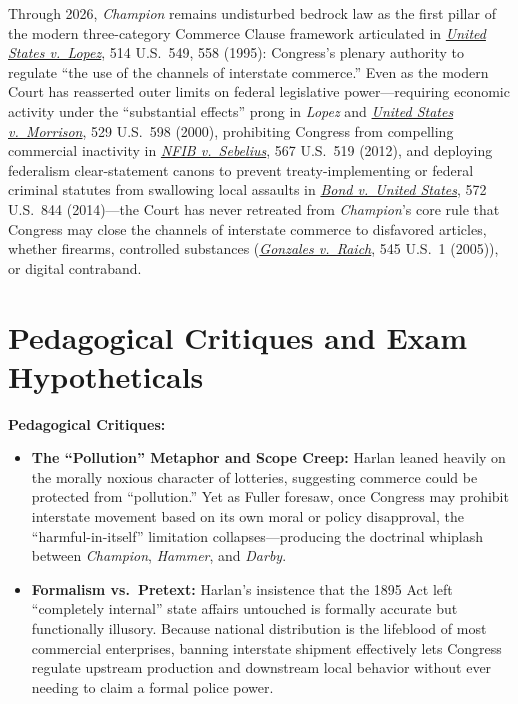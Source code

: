 \documentclass[12pt]{article}
\begin{document}
Through 2026, \textit{Champion} remains undisturbed bedrock law as the first pillar of the modern three-category Commerce Clause framework articulated in \href{https://supreme.justia.com/cases/federal/us/514/549/}{\textit{United States v.\ Lopez}}, 514 U.S.\ 549, 558 (1995): Congress's plenary authority to regulate ``the use of the channels of interstate commerce.'' Even as the modern Court has reasserted outer limits on federal legislative power---requiring economic activity under the ``substantial effects'' prong in \textit{Lopez} and \href{https://supreme.justia.com/cases/federal/us/529/598/case.pdf}{\textit{United States v.\ Morrison}}, 529 U.S.\ 598 (2000), prohibiting Congress from compelling commercial inactivity in \href{https://supreme.justia.com/cases/federal/us/567/519/}{\textit{NFIB v.\ Sebelius}}, 567 U.S.\ 519 (2012), and deploying federalism clear-statement canons to prevent treaty-implementing or federal criminal statutes from swallowing local assaults in \href{https://supreme.justia.com/cases/federal/us/572/844/}{\textit{Bond v.\ United States}}, 572 U.S.\ 844 (2014)---the Court has never retreated from \textit{Champion}'s core rule that Congress may close the channels of interstate commerce to disfavored articles, whether firearms, controlled substances (\href{https://supreme.justia.com/cases/federal/us/545/1/}{\textit{Gonzales v.\ Raich}}, 545 U.S.\ 1 (2005)), or digital contraband.

\section{Pedagogical Critiques and Exam Hypotheticals}
\textbf{Pedagogical Critiques:}
\begin{itemize}
  \item \textbf{The ``Pollution'' Metaphor and Scope Creep:} Harlan leaned heavily on the morally noxious character of lotteries, suggesting commerce could be protected from ``pollution.'' Yet as Fuller foresaw, once Congress may prohibit interstate movement based on its own moral or policy disapproval, the ``harmful-in-itself'' limitation collapses---producing the doctrinal whiplash between \textit{Champion}, \textit{Hammer}, and \textit{Darby}.
  \item \textbf{Formalism vs.\ Pretext:} Harlan's insistence that the 1895 Act left ``completely internal'' state affairs untouched is formally accurate but functionally illusory. Because national distribution is the lifeblood of most commercial enterprises, banning interstate shipment effectively lets Congress regulate upstream production and downstream local behavior without ever needing to claim a formal police power.
\end{itemize}
\end{document}
